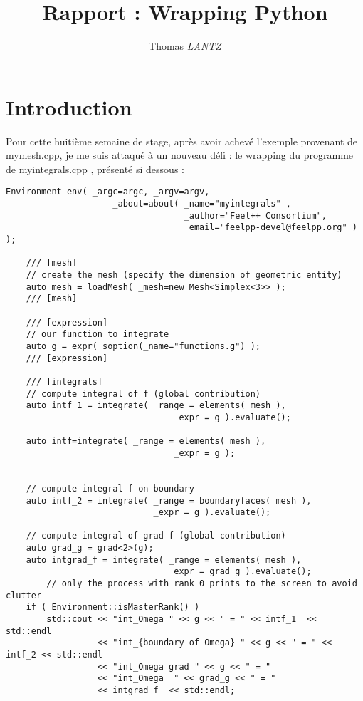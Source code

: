 \documentclass[12pt]{article}
\title {Rapport : Wrapping Python}
\author {Thomas \emph{LANTZ}}
\begin{document}
\maketitle 

\section{Introduction}

Pour cette huitième semaine de stage, après avoir achevé l'exemple provenant de mymesh.cpp, je me suis attaqué à un nouveau défi : le wrapping du programme de myintegrals.cpp , présenté si dessous :  \\

\begin{lstlisting}
Environment env( _argc=argc, _argv=argv,
                     _about=about( _name="myintegrals" ,
                                   _author="Feel++ Consortium",
                                   _email="feelpp-devel@feelpp.org" ) );

    /// [mesh]
    // create the mesh (specify the dimension of geometric entity)
    auto mesh = loadMesh( _mesh=new Mesh<Simplex<3>> );
    /// [mesh]

    /// [expression]
    // our function to integrate
    auto g = expr( soption(_name="functions.g") );
    /// [expression]

    /// [integrals]
    // compute integral of f (global contribution)
    auto intf_1 = integrate( _range = elements( mesh ),
                                 _expr = g ).evaluate();

    auto intf=integrate( _range = elements( mesh ),
                                 _expr = g );
    
    
    // compute integral f on boundary
    auto intf_2 = integrate( _range = boundaryfaces( mesh ),
                             _expr = g ).evaluate();
    
    // compute integral of grad f (global contribution)
    auto grad_g = grad<2>(g);
    auto intgrad_f = integrate( _range = elements( mesh ),
                                _expr = grad_g ).evaluate();
        // only the process with rank 0 prints to the screen to avoid clutter
    if ( Environment::isMasterRank() )
        std::cout << "int_Omega " << g << " = " << intf_1  << std::endl
                  << "int_{boundary of Omega} " << g << " = " << intf_2 << std::endl
                  << "int_Omega grad " << g << " = "
                  << "int_Omega  " << grad_g << " = "
                  << intgrad_f  << std::endl;
\end{lstlisting}
\end{document}
